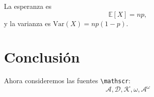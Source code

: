 La esperanza es
\begin{equation}
  \mathbb{E}[X] = np,
\end{equation}
y la varianza es $\mathrm{Var}(X) = np(1-p)$.

\lipsum[11-12]

\section{Conclusión}
\lipsum[13-14]

Ahora consideremos las fuentes \texttt{\backslash mathscr}:
\[ \mathscr{A}, \mathscr{D}, \mathscr{K}, \omega, \mathscr{A}^\omega  \]